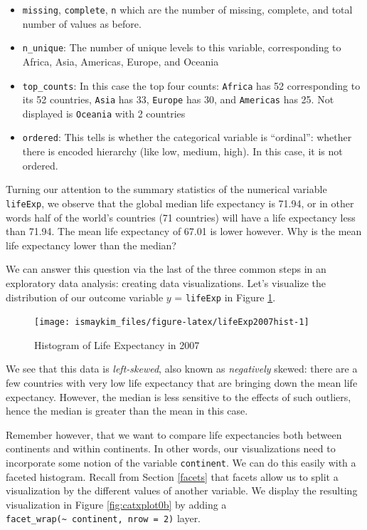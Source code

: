 \documentclass[12pt, krantz2,]{krantz}
\providecommand{\tightlist}{%
  \setlength{\itemsep}{0pt}\setlength{\parskip}{0pt}}
\begin{document}
\begin{itemize}
\tightlist
\item
  \texttt{missing}, \texttt{complete}, \texttt{n} which are the number of missing, complete, and total number of values as before.
\item
  \texttt{n\_unique}: The number of unique levels to this variable, corresponding to Africa, Asia, Americas, Europe, and Oceania
\item
  \texttt{top\_counts}: In this case the top four counts: \texttt{Africa} has 52 corresponding to its 52 countries, \texttt{Asia} has 33, \texttt{Europe} has 30, and \texttt{Americas} has 25. Not displayed is \texttt{Oceania} with 2 countries
\item
  \texttt{ordered}: This tells is whether the categorical variable is ``ordinal'': whether there is encoded hierarchy (like low, medium, high). In this case, it is not ordered.
\end{itemize}

Turning our attention to the summary statistics of the numerical variable \texttt{lifeExp}, we observe that the global median life expectancy is 71.94, or in other words half of the world's countries (71 countries) will have a life expectancy less than 71.94. The mean life expectancy of 67.01 is lower however. Why is the mean life expectancy lower than the median?

We can answer this question via the last of the three common steps in an exploratory data analysis: creating data visualizations. Let's visualize the distribution of our outcome variable \(y\) = \texttt{lifeExp} in Figure \ref{fig:lifeExp2007hist}.

\begin{figure}

{\centering \texttt{[image: ismaykim\_files/figure-latex/lifeExp2007hist-1]} 

}

\caption{Histogram of Life Expectancy in 2007}\label{fig:lifeExp2007hist}
\end{figure}

We see that this data is \emph{left-skewed}, also known as \emph{negatively} skewed: there are a few countries with very low life expectancy that are bringing down the mean life expectancy. However, the median is less sensitive to the effects of such outliers, hence the median is greater than the mean in this case.

Remember however, that we want to compare life expectancies both between continents and within continents. In other words, our visualizations need to incorporate some notion of the variable \texttt{continent}. We can do this easily with a faceted histogram. Recall from Section \ref{facets} that facets allow us to split a visualization by the different values of another variable. We display the resulting visualization in Figure \ref{fig:catxplot0b} by adding a \texttt{facet\_wrap(\textasciitilde{}\ continent,\ nrow\ =\ 2)} layer.
\end{document}
